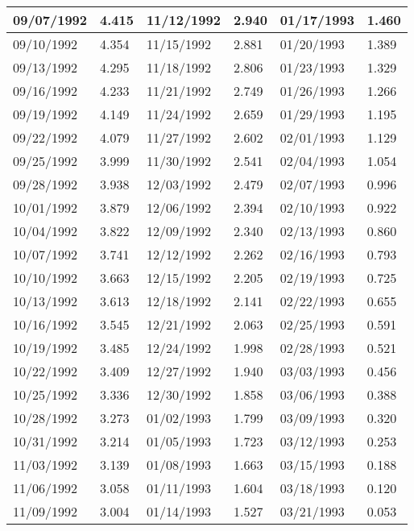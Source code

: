 \begin{tabular}{|l|l|l|l|l|l|}
\hline
09/07/1992 & 4.415  & 11/12/1992 & 2.940  & 01/17/1993 & 1.460  \\
\hline
09/10/1992 & 4.354  & 11/15/1992 & 2.881  & 01/20/1993 & 1.389  \\
\hline
09/13/1992 & 4.295  & 11/18/1992 & 2.806  & 01/23/1993 & 1.329  \\
\hline
09/16/1992 & 4.233  & 11/21/1992 & 2.749  & 01/26/1993 & 1.266  \\
\hline
09/19/1992 & 4.149  & 11/24/1992 & 2.659  & 01/29/1993 & 1.195  \\
\hline
09/22/1992 & 4.079  & 11/27/1992 & 2.602  & 02/01/1993 & 1.129  \\
\hline
09/25/1992 & 3.999  & 11/30/1992 & 2.541  & 02/04/1993 & 1.054  \\
\hline
09/28/1992 & 3.938  & 12/03/1992 & 2.479  & 02/07/1993 & 0.996  \\
\hline
10/01/1992 & 3.879  & 12/06/1992 & 2.394  & 02/10/1993 & 0.922  \\
\hline
10/04/1992 & 3.822  & 12/09/1992 & 2.340  & 02/13/1993 & 0.860  \\
\hline
10/07/1992 & 3.741  & 12/12/1992 & 2.262  & 02/16/1993 & 0.793  \\
\hline
10/10/1992 & 3.663  & 12/15/1992 & 2.205  & 02/19/1993 & 0.725  \\
\hline
10/13/1992 & 3.613  & 12/18/1992 & 2.141  & 02/22/1993 & 0.655  \\
\hline
10/16/1992 & 3.545  & 12/21/1992 & 2.063  & 02/25/1993 & 0.591  \\
\hline
10/19/1992 & 3.485  & 12/24/1992 & 1.998  & 02/28/1993 & 0.521  \\
\hline
10/22/1992 & 3.409  & 12/27/1992 & 1.940  & 03/03/1993 & 0.456  \\
\hline
10/25/1992 & 3.336  & 12/30/1992 & 1.858  & 03/06/1993 & 0.388  \\
\hline
10/28/1992 & 3.273  & 01/02/1993 & 1.799  & 03/09/1993 & 0.320  \\
\hline
10/31/1992 & 3.214  & 01/05/1993 & 1.723  & 03/12/1993 & 0.253  \\
\hline
11/03/1992 & 3.139  & 01/08/1993 & 1.663  & 03/15/1993 & 0.188  \\
\hline
11/06/1992 & 3.058  & 01/11/1993 & 1.604  & 03/18/1993 & 0.120  \\
\hline
11/09/1992 & 3.004  & 01/14/1993 & 1.527  & 03/21/1993 & 0.053  \\
\hline
\end{tabular}
